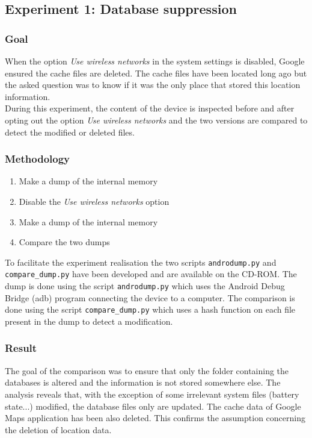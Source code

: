 \subsection{Experiment 1: Database suppression}

\subsubsection{Goal}

When the option \emph{Use wireless networks} in the system settings is disabled, Google ensured the cache files are deleted.
The cache files have been located long ago but the asked question was to know if it was the only place that stored this location information.\\

During this experiment, the content of the device is inspected before and after opting out the option \emph{Use wireless networks} and the two versions are compared to detect the modified or deleted files.

\subsubsection{Methodology}

\begin{enumerate}
\item Make a dump of the internal memory
\item Disable the \emph{Use wireless networks} option
\item Make a dump of the internal memory
\item Compare the two dumps
\end{enumerate}

To facilitate the experiment realisation the two scripts \texttt{androdump.py} and \texttt{compare\_dump.py} have been developed and are available on the CD-ROM.
The dump is done using the script \texttt{androdump.py} which uses the Android Debug Bridge (adb) program connecting the device to a computer.
The comparison is done using the script \texttt{compare\_dump.py} which uses a hash function on each file present in the dump to detect a modification.

\subsubsection{Result}

The goal of the comparison was to ensure that only the folder containing the databases is altered and the information is not stored somewhere else.
The analysis reveals that, with the exception of some irrelevant system files (battery state...) modified, the database files only are updated.
The cache data of Google Maps application has been also deleted.
This confirms the assumption concerning the deletion of location data.\\

